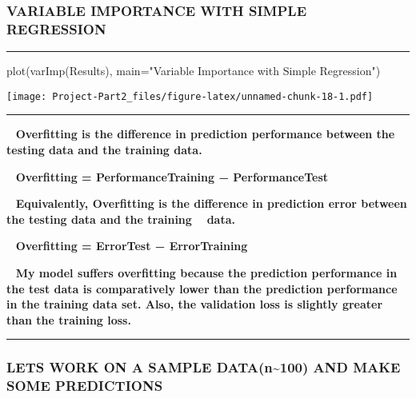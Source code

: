\documentclass[
]{article}
\newenvironment{Shaded}{\begin{snugshade}}{\end{snugshade}}
\newcommand{\AttributeTok}[1]{\textcolor[rgb]{0.77,0.63,0.00}{#1}}
\newcommand{\FunctionTok}[1]{\textcolor[rgb]{0.00,0.00,0.00}{#1}}
\newcommand{\NormalTok}[1]{#1}
\newcommand{\StringTok}[1]{\textcolor[rgb]{0.31,0.60,0.02}{#1}}
\begin{document}
\hypertarget{variable-importance-with-simple-regression}{%
\subsubsection{\texorpdfstring{\textbf{VARIABLE IMPORTANCE WITH SIMPLE
REGRESSION}}{VARIABLE IMPORTANCE WITH SIMPLE REGRESSION}}\label{variable-importance-with-simple-regression}}

\begin{center}\rule{0.5\linewidth}{0.5pt}\end{center}

\begin{Shaded}
\begin{Highlighting}[]
\FunctionTok{plot}\NormalTok{(}\FunctionTok{varImp}\NormalTok{(Results), }\AttributeTok{main=}\StringTok{"Variable Importance with Simple Regression"}\NormalTok{)}
\end{Highlighting}
\end{Shaded}

\texttt{[image: Project-Part2\_files/figure-latex/unnamed-chunk-18-1.pdf]}

\begin{center}\rule{0.5\linewidth}{0.5pt}\end{center}

~ \textbf{Overfitting is the difference in prediction performance
between the testing data and the training data.}

~ \textbf{Overfitting = PerformanceTraining − PerformanceTest}

~ \textbf{Equivalently, Overfitting is the difference in prediction
error between the testing data and the training ~ data.}

~ \textbf{Overfitting = ErrorTest − ErrorTraining}

~ \textbf{My model suffers overfitting because the prediction
performance in the test data is comparatively lower than the prediction
performance in the training data set. Also, the validation loss is
slightly greater than the training loss.}

\begin{center}\rule{0.5\linewidth}{0.5pt}\end{center}

\hypertarget{lets-work-on-a-sample-datan100-and-make-some-predictions}{%
\subsubsection{\texorpdfstring{\textbf{LETS WORK ON A SAMPLE
DATA(n\textasciitilde100) AND MAKE SOME
PREDICTIONS}}{LETS WORK ON A SAMPLE DATA(n\textasciitilde100) AND MAKE SOME PREDICTIONS}}\label{lets-work-on-a-sample-datan100-and-make-some-predictions}}
\end{document}
